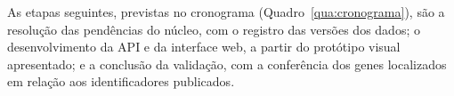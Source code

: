 As etapas seguintes, previstas no cronograma (Quadro~\ref{qua:cronograma}), são a resolução das pendências do núcleo, com o registro das versões dos dados; o desenvolvimento da API e da interface web, a partir do protótipo visual apresentado; e a conclusão da validação, com a conferência dos genes localizados em relação aos identificadores publicados.
